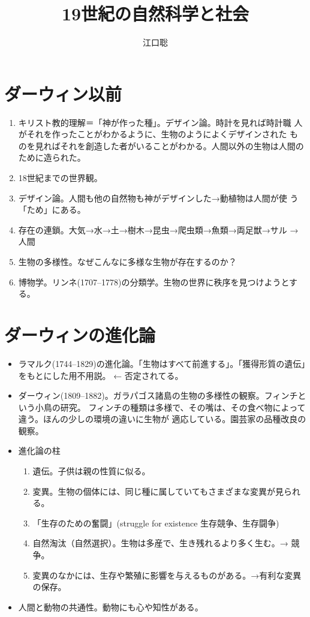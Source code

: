 \documentclass[dvipdfmx]{jsarticle}
\author{江口聡}
\title{19世紀の自然科学と社会}
\begin{document}
\maketitle


\section{ダーウィン以前}

\begin{enumerate}
 \item キリスト教的理解＝「神が作った種」。デザイン論。時計を見れば時計職
       人がそれを作ったことがわかるように、生物のようによくデザインされた
       ものを見ればそれを創造した者がいることがわかる。人間以外の生物は人間のために造られた。

\item 18世紀までの世界観。
\item デザイン論。人間も他の自然物も神がデザインした→動植物は人間が使
  う「ため」にある。
\item 存在の連鎖。大気→水→土→樹木→昆虫→爬虫類→魚類→両足獣→サル
  →人間
\item 生物の多様性。なぜこんなに多様な生物が存在するのか？
\item 博物学。リンネ(1707--1778)の分類学。生物の世界に秩序を見つけようとする。

\end{enumerate}



\section{ダーウィンの進化論}

\begin{itemize}
\item ラマルク(1744--1829)の進化論。「生物はすべて前進する」。「獲得形質の遺伝」をもとにした用不用説。 ← 否定されてる。
\item ダーウィン(1809--1882)。ガラパゴス諸島の生物の多様性の観察。フィンチという小鳥の研究。
  フィンチの種類は多様で、その嘴は、その食べ物によって違う。ほんの少しの環境の違いに生物が
  適応している。園芸家の品種改良の観察。
\item 進化論の柱
  \begin{enumerate}
  \item 遺伝。子供は親の性質に似る。
  \item 変異。生物の個体には、同じ種に属していてもさまざまな変異が見られる。
  \item 「生存のための奮闘」(struggle for existence 生存競争、生存闘争)
  \item 自然淘汰（自然選択）。生物は多産で、生き残れるより多く生む。→ 競争。
  \item 変異のなかには、生存や繁殖に影響を与えるものがある。→有利な変異の保存。
  \end{enumerate}
\item 人間と動物の共通性。動物にも心や知性がある。
\end{itemize}
\end{document}
